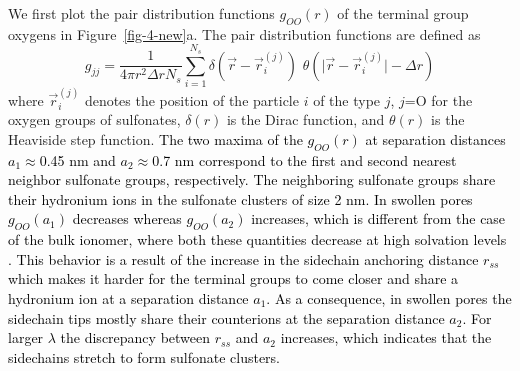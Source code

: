 \documentclass[3p,english,preprint]{elsarticle}
\newcommand{\need}[1]{\textcolor{black}{#1}}
\newcommand{\mage}[1]{\textcolor{black}{#1}}
\begin{document}
We first plot the  pair distribution functions $g_{OO}(r)$ of the terminal group oxygens 
in Figure~\ref{fig-4-new}a. The   pair distribution functions are defined as
\begin{equation}
g_{jj} = 
\frac{1}{4 \pi r^2 \Delta r N_s}
\displaystyle\sum_{i=1}^{N_s} \delta{\left(\vec r - \vec r_i^{(j)} \right)} 
\,\, \theta \left( \vert \vec r -  \vec r_i^{(j)} \vert  - \Delta r\right)
\label{grr}
\end{equation}
where $\vec r_i^{(j)}$ denotes the position of the particle $i$ of the type $j$, 
 $j$=O for the oxygen groups of sulfonates,  
$\delta(r)$ is the Dirac function, and $\theta(r)$ is the Heaviside step function. 
{\need{  
The two maxima of the $g_{OO}(r)$  at separation distances $a_1$$\approx$0.45 nm
and $a_2$$\approx$0.7 nm correspond to the first and 
second nearest neighbor sulfonate groups, respectively.
The neighboring sulfonate groups share their hydronium ions in the sulfonate clusters of size 2 nm. 
In swollen pores  $g_{OO}(a_1)$ decreases whereas $g_{OO}(a_2)$ increases, 
which is different from the case of the bulk ionomer, 
 where both these quantities decrease at high solvation levels 
 \cite{allahyarov-2010-poling-pre,blake2005}.
This behavior is a result of the increase in the sidechain anchoring distance $r_{ss}$ 
which makes it harder for the terminal groups to come closer and share a hydronium ion at a 
separation distance $a_1$. As a consequence, in swollen pores the 
sidechain tips mostly share their counterions  at the separation distance $a_2$.
For larger $\lambda$ the  discrepancy between $r_{ss}$  and $a_2$ increases, which indicates 
that the sidechains stretch to form sulfonate clusters. 
}}
 
\end{document}
